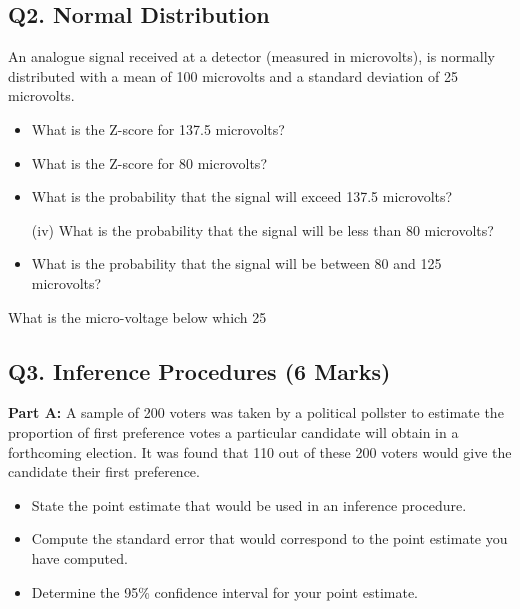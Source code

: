

\subsection*{Q2. Normal Distribution }
An analogue signal received at a detector (measured in microvolts), is normally distributed with a mean of 100 microvolts 
and a standard deviation of 25 microvolts.

\begin{itemize}

\item  What is the Z-score for 137.5 microvolts? 

\item  What is the Z-score for 80 microvolts?

\item  What is the probability that the signal will exceed 137.5 microvolts? 

\item[(iv)] What is the probability that the signal will be less than 80 microvolts?

\item   What is the probability that the signal will be between 80 and 125 microvolts?
\end{itemize}

%
\item[(iii)] What is the micro-voltage below which 25%
\item[(4 marks)]

\newpage
\subsection*{Q3. Inference Procedures (6 Marks)}


\textbf{Part A:} A sample of 200 voters was taken by a political pollster to estimate the proportion of first preference votes a 
particular candidate will obtain in a forthcoming election. 
It was found that 110 out of these 200 voters would give the candidate their first preference.


\begin{itemize}

\item  State the point estimate that would be used in an inference procedure.

\item  Compute the standard error that would correspond to the point estimate you have computed.

\item  Determine the 95\% confidence interval for your point estimate.
\end{itemize}

